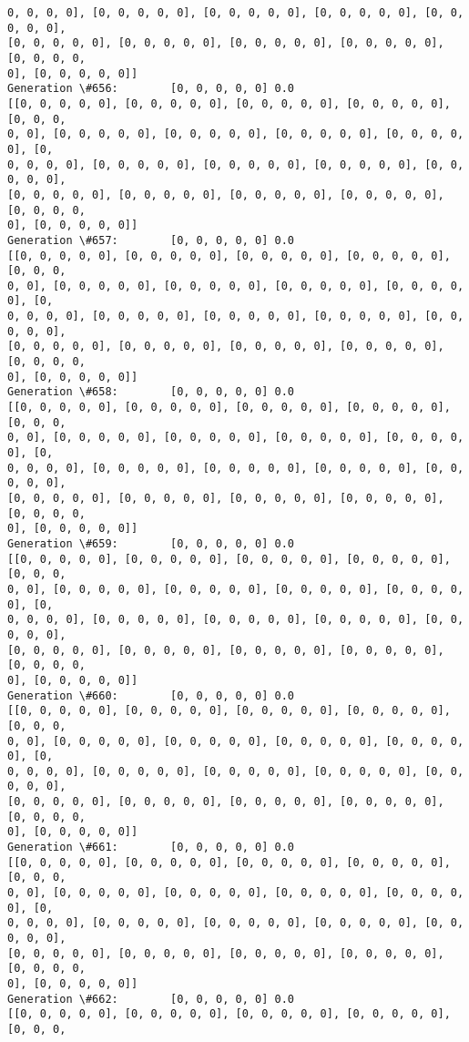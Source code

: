 \documentclass[11pt]{article}
\begin{document}
\begin{Verbatim}[commandchars=\\\{\}]
0, 0, 0, 0], [0, 0, 0, 0, 0], [0, 0, 0, 0, 0], [0, 0, 0, 0, 0], [0, 0, 0, 0, 0],
[0, 0, 0, 0, 0], [0, 0, 0, 0, 0], [0, 0, 0, 0, 0], [0, 0, 0, 0, 0], [0, 0, 0, 0,
0], [0, 0, 0, 0, 0]]
Generation \#656:        [0, 0, 0, 0, 0] 0.0
[[0, 0, 0, 0, 0], [0, 0, 0, 0, 0], [0, 0, 0, 0, 0], [0, 0, 0, 0, 0], [0, 0, 0,
0, 0], [0, 0, 0, 0, 0], [0, 0, 0, 0, 0], [0, 0, 0, 0, 0], [0, 0, 0, 0, 0], [0,
0, 0, 0, 0], [0, 0, 0, 0, 0], [0, 0, 0, 0, 0], [0, 0, 0, 0, 0], [0, 0, 0, 0, 0],
[0, 0, 0, 0, 0], [0, 0, 0, 0, 0], [0, 0, 0, 0, 0], [0, 0, 0, 0, 0], [0, 0, 0, 0,
0], [0, 0, 0, 0, 0]]
Generation \#657:        [0, 0, 0, 0, 0] 0.0
[[0, 0, 0, 0, 0], [0, 0, 0, 0, 0], [0, 0, 0, 0, 0], [0, 0, 0, 0, 0], [0, 0, 0,
0, 0], [0, 0, 0, 0, 0], [0, 0, 0, 0, 0], [0, 0, 0, 0, 0], [0, 0, 0, 0, 0], [0,
0, 0, 0, 0], [0, 0, 0, 0, 0], [0, 0, 0, 0, 0], [0, 0, 0, 0, 0], [0, 0, 0, 0, 0],
[0, 0, 0, 0, 0], [0, 0, 0, 0, 0], [0, 0, 0, 0, 0], [0, 0, 0, 0, 0], [0, 0, 0, 0,
0], [0, 0, 0, 0, 0]]
Generation \#658:        [0, 0, 0, 0, 0] 0.0
[[0, 0, 0, 0, 0], [0, 0, 0, 0, 0], [0, 0, 0, 0, 0], [0, 0, 0, 0, 0], [0, 0, 0,
0, 0], [0, 0, 0, 0, 0], [0, 0, 0, 0, 0], [0, 0, 0, 0, 0], [0, 0, 0, 0, 0], [0,
0, 0, 0, 0], [0, 0, 0, 0, 0], [0, 0, 0, 0, 0], [0, 0, 0, 0, 0], [0, 0, 0, 0, 0],
[0, 0, 0, 0, 0], [0, 0, 0, 0, 0], [0, 0, 0, 0, 0], [0, 0, 0, 0, 0], [0, 0, 0, 0,
0], [0, 0, 0, 0, 0]]
Generation \#659:        [0, 0, 0, 0, 0] 0.0
[[0, 0, 0, 0, 0], [0, 0, 0, 0, 0], [0, 0, 0, 0, 0], [0, 0, 0, 0, 0], [0, 0, 0,
0, 0], [0, 0, 0, 0, 0], [0, 0, 0, 0, 0], [0, 0, 0, 0, 0], [0, 0, 0, 0, 0], [0,
0, 0, 0, 0], [0, 0, 0, 0, 0], [0, 0, 0, 0, 0], [0, 0, 0, 0, 0], [0, 0, 0, 0, 0],
[0, 0, 0, 0, 0], [0, 0, 0, 0, 0], [0, 0, 0, 0, 0], [0, 0, 0, 0, 0], [0, 0, 0, 0,
0], [0, 0, 0, 0, 0]]
Generation \#660:        [0, 0, 0, 0, 0] 0.0
[[0, 0, 0, 0, 0], [0, 0, 0, 0, 0], [0, 0, 0, 0, 0], [0, 0, 0, 0, 0], [0, 0, 0,
0, 0], [0, 0, 0, 0, 0], [0, 0, 0, 0, 0], [0, 0, 0, 0, 0], [0, 0, 0, 0, 0], [0,
0, 0, 0, 0], [0, 0, 0, 0, 0], [0, 0, 0, 0, 0], [0, 0, 0, 0, 0], [0, 0, 0, 0, 0],
[0, 0, 0, 0, 0], [0, 0, 0, 0, 0], [0, 0, 0, 0, 0], [0, 0, 0, 0, 0], [0, 0, 0, 0,
0], [0, 0, 0, 0, 0]]
Generation \#661:        [0, 0, 0, 0, 0] 0.0
[[0, 0, 0, 0, 0], [0, 0, 0, 0, 0], [0, 0, 0, 0, 0], [0, 0, 0, 0, 0], [0, 0, 0,
0, 0], [0, 0, 0, 0, 0], [0, 0, 0, 0, 0], [0, 0, 0, 0, 0], [0, 0, 0, 0, 0], [0,
0, 0, 0, 0], [0, 0, 0, 0, 0], [0, 0, 0, 0, 0], [0, 0, 0, 0, 0], [0, 0, 0, 0, 0],
[0, 0, 0, 0, 0], [0, 0, 0, 0, 0], [0, 0, 0, 0, 0], [0, 0, 0, 0, 0], [0, 0, 0, 0,
0], [0, 0, 0, 0, 0]]
Generation \#662:        [0, 0, 0, 0, 0] 0.0
[[0, 0, 0, 0, 0], [0, 0, 0, 0, 0], [0, 0, 0, 0, 0], [0, 0, 0, 0, 0], [0, 0, 0,

\end{Verbatim}
\end{document}
